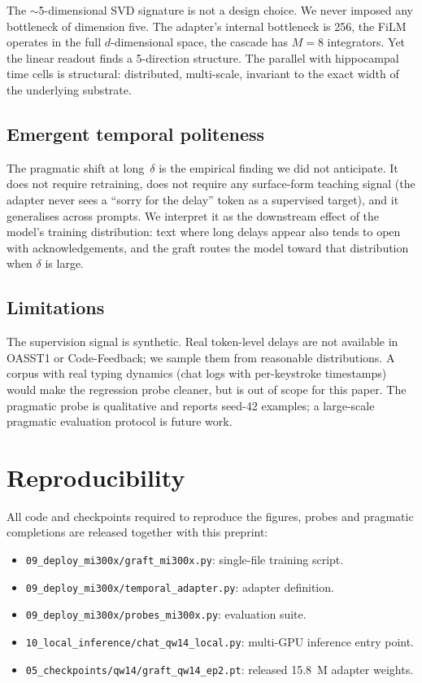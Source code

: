 \documentclass[10pt,twocolumn,letterpaper]{article}
\begin{document}
The $\sim$5-dimensional SVD signature is not a design choice. We never imposed any bottleneck of dimension five. The adapter's internal bottleneck is 256, the FiLM operates in the full $d$-dimensional space, the cascade has $M=8$ integrators. Yet the linear readout finds a 5-direction structure. The parallel with hippocampal time cells is structural: distributed, multi-scale, invariant to the exact width of the underlying substrate.

\subsection{Emergent temporal politeness}

The pragmatic shift at long~$\delta$ is the empirical finding we did not anticipate. It does not require retraining, does not require any surface-form teaching signal (the adapter never sees a ``sorry for the delay'' token as a supervised target), and it generalises across prompts. We interpret it as the downstream effect of the model's training distribution: text where long delays appear also tends to open with acknowledgements, and the graft routes the model toward that distribution when $\delta$ is large.

\subsection{Limitations}

The supervision signal is synthetic. Real token-level delays are not available in OASST1 or Code-Feedback; we sample them from reasonable distributions. A corpus with real typing dynamics (chat logs with per-keystroke timestamps) would make the regression probe cleaner, but is out of scope for this paper. The pragmatic probe is qualitative and reports seed-42 examples; a large-scale pragmatic evaluation protocol is future work.

\section{Reproducibility}

All code and checkpoints required to reproduce the figures, probes and pragmatic completions are released together with this preprint:

\begin{itemize}[leftmargin=0.6cm, itemsep=1pt]
    \item \texttt{09\_deploy\_mi300x/graft\_mi300x.py}: single-file training script.
    \item \texttt{09\_deploy\_mi300x/temporal\_adapter.py}: adapter definition.
    \item \texttt{09\_deploy\_mi300x/probes\_mi300x.py}: evaluation suite.
    \item \texttt{10\_local\_inference/chat\_qw14\_local.py}: multi-GPU inference entry point.
    \item \texttt{05\_checkpoints/qw14/graft\_qw14\_ep2.pt}: released 15.8~M adapter weights.
\end{itemize}
\end{document}
